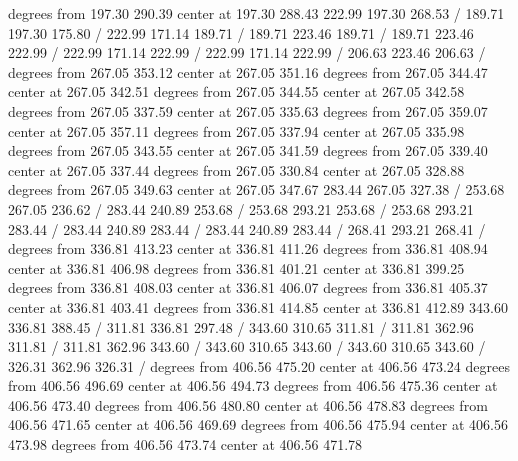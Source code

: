 { degrees from 197.30 290.39 center at 197.30 288.43
\setsolid
{} 222.99 197.30 268.53 /
\setsolid
{} 189.71 197.30 175.80 /
\setsolid
{} 222.99 171.14 189.71 /
 189.71 223.46 189.71 /
 189.71 223.46 222.99 /
 222.99 171.14 222.99 /
 222.99 171.14 222.99 /
\setsolid
{} 206.63 223.46 206.63 /
 degrees from 267.05 353.12 center at 267.05 351.16
 degrees from 267.05 344.47 center at 267.05 342.51
 degrees from 267.05 344.55 center at 267.05 342.58
 degrees from 267.05 337.59 center at 267.05 335.63
 degrees from 267.05 359.07 center at 267.05 357.11
 degrees from 267.05 337.94 center at 267.05 335.98
 degrees from 267.05 343.55 center at 267.05 341.59
 degrees from 267.05 339.40 center at 267.05 337.44
 degrees from 267.05 330.84 center at 267.05 328.88
 degrees from 267.05 349.63 center at 267.05 347.67
\setsolid
{} 283.44 267.05 327.38 /
\setsolid
{} 253.68 267.05 236.62 /
\setsolid
{} 283.44 240.89 253.68 /
 253.68 293.21 253.68 /
 253.68 293.21 283.44 /
 283.44 240.89 283.44 /
 283.44 240.89 283.44 /
\setsolid
{} 268.41 293.21 268.41 /
 degrees from 336.81 413.23 center at 336.81 411.26
 degrees from 336.81 408.94 center at 336.81 406.98
 degrees from 336.81 401.21 center at 336.81 399.25
 degrees from 336.81 408.03 center at 336.81 406.07
 degrees from 336.81 405.37 center at 336.81 403.41
 degrees from 336.81 414.85 center at 336.81 412.89
\setsolid
{} 343.60 336.81 388.45 /
\setsolid
{} 311.81 336.81 297.48 /
\setsolid
{} 343.60 310.65 311.81 /
 311.81 362.96 311.81 /
 311.81 362.96 343.60 /
 343.60 310.65 343.60 /
 343.60 310.65 343.60 /
\setsolid
{} 326.31 362.96 326.31 /
 degrees from 406.56 475.20 center at 406.56 473.24
 degrees from 406.56 496.69 center at 406.56 494.73
 degrees from 406.56 475.36 center at 406.56 473.40
 degrees from 406.56 480.80 center at 406.56 478.83
 degrees from 406.56 471.65 center at 406.56 469.69
 degrees from 406.56 475.94 center at 406.56 473.98
 degrees from 406.56 473.74 center at 406.56 471.78
}
